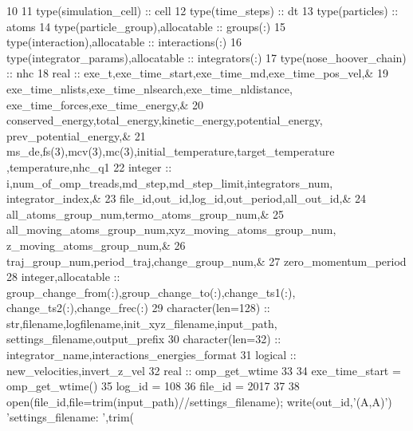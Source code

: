 \begin{DoxyCode}
10 
11 \textcolor{keywordtype}{type}(simulation\_cell)                   :: cell
12 \textcolor{keywordtype}{type}(time\_steps)                        :: dt
13 \textcolor{keywordtype}{type}(particles)                         :: atoms
14 \textcolor{keywordtype}{type}(particle\_group),allocatable        :: groups(:)
15 \textcolor{keywordtype}{type}(interaction),allocatable           :: interactions(:)
16 \textcolor{keywordtype}{type}(integrator\_params),allocatable     :: integrators(:)
17 \textcolor{keywordtype}{type}(nose\_hoover\_chain)                 :: nhc
18 real                                    ::  exe\_t,exe\_time\_start,exe\_time\_md,exe\_time\_pos\_vel,&
19                                             exe\_time\_nlists,exe\_time\_nlsearch,exe\_time\_nldistance,
      exe\_time\_forces,exe\_time\_energy,&
20                                             conserved\_energy,total\_energy,kinetic\_energy,potential\_energy,
      prev\_potential\_energy,&
21                                             ms\_de,fs(3),mcv(3),mc(3),initial\_temperature,target\_temperature
      ,temperature,nhc\_q1
22 integer                                 ::  i,num\_of\_omp\_treads,md\_step,md\_step\_limit,integrators\_num,
      integrator\_index,&
23                                             file\_id,out\_id,log\_id,out\_period,all\_out\_id,&
24                                             all\_atoms\_group\_num,termo\_atoms\_group\_num,&
25                                             all\_moving\_atoms\_group\_num,xyz\_moving\_atoms\_group\_num,
      z\_moving\_atoms\_group\_num,&
26                                             traj\_group\_num,period\_traj,change\_group\_num,&
27                                             zero\_momentum\_period
28 \textcolor{keywordtype}{integer},allocatable                     ::  group\_change\_from(:),group\_change\_to(:),change\_ts1(:),
      change\_ts2(:),change\_frec(:)
29 \textcolor{keywordtype}{character}(len=128)                      ::  str,filename,logfilename,init\_xyz\_filename,input\_path,
      settings\_filename,output\_prefix
30 \textcolor{keywordtype}{character}(len=32)                       ::  integrator\_name,interactions\_energies\_format
31 \textcolor{keywordtype}{logical}                                 ::  new\_velocities,invert\_z\_vel
32 real                                    ::  omp\_get\_wtime
33     
34 exe\_time\_start = omp\_get\_wtime()
35 log\_id = 108
36 file\_id = 2017
37 
38 \textcolor{keyword}{open}(file\_id,file=trim(input\_path)//settings\_filename); \textcolor{keyword}{write}(out\_id,\textcolor{stringliteral}{'(A,A)'}) \textcolor{stringliteral}{'settings\_filename: '},trim(

\end{DoxyCode}
